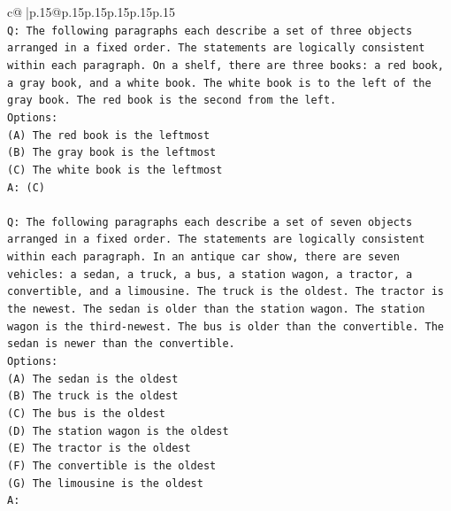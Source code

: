 \documentclass{article}
\begin{document}
{\begin{supertabular}{c@{$\;$}|p{.15\linewidth}@{}p{.15\linewidth}p{.15\linewidth}p{.15\linewidth}p{.15\linewidth}p{.15\linewidth}}
{{{\\ 
\texttt{Q: The following paragraphs each describe a set of three objects arranged in a fixed order. The statements are logically consistent within each paragraph. On a shelf, there are three books: a red book, a gray book, and a white book. The white book is to the left of the gray book. The red book is the second from the left.} \\
\texttt{Options:} \\
\texttt{(A) The red book is the leftmost} \\
\texttt{(B) The gray book is the leftmost} \\
\texttt{(C) The white book is the leftmost} \\
\texttt{A: (C)} \\
\\ 
\texttt{Q: The following paragraphs each describe a set of seven objects arranged in a fixed order. The statements are logically consistent within each paragraph. In an antique car show, there are seven vehicles: a sedan, a truck, a bus, a station wagon, a tractor, a convertible, and a limousine. The truck is the oldest. The tractor is the newest. The sedan is older than the station wagon. The station wagon is the third{-}newest. The bus is older than the convertible. The sedan is newer than the convertible.} \\
\texttt{Options:} \\
\texttt{(A) The sedan is the oldest} \\
\texttt{(B) The truck is the oldest} \\
\texttt{(C) The bus is the oldest} \\
\texttt{(D) The station wagon is the oldest} \\
\texttt{(E) The tractor is the oldest} \\
\texttt{(F) The convertible is the oldest} \\
\texttt{(G) The limousine is the oldest} \\
\texttt{A:} \\
            }
        }
    }
     \\ \\


\end{supertabular}}
\end{document}
